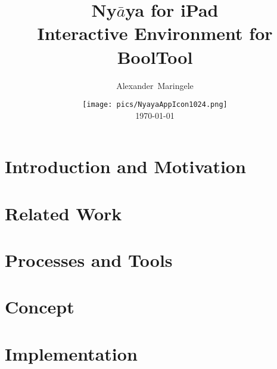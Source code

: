 \documentclass{clbthesis}
\begin{document}
\nocite{*}

\title{Ny$\bar{a}$ya for iPad\vspace{0.5cm}\\ \LARGE{Interactive Environment for BoolTool}}
\author{Alexander~Maringele}
\date{\texttt{[image: pics/NyayaAppIcon1024.png]}\\ \today}


\maketitle

\abstract{}

\tableofcontents
\chapter{Introduction and Motivation} 			


\chapter{Related Work}						


\chapter{Processes and Tools}					


\chapter{Concept}							


\chapter{Implementation}						

\end{document}

